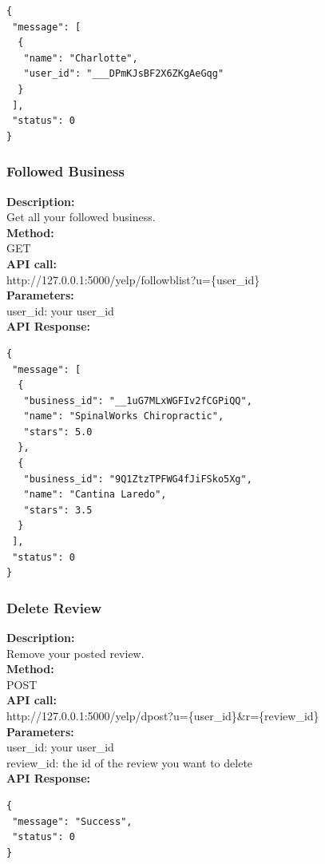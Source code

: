 \documentclass[12pt]{article}
\begin{document}
\begin{singlespacing}
\begin{lstlisting}
{
 "message": [
  {
   "name": "Charlotte",
   "user_id": "___DPmKJsBF2X6ZKgAeGqg"
  }
 ],
 "status": 0
}
\end{lstlisting}
\end{singlespacing}

\subsubsection{Followed Business}
\textbf{Description:}\\
Get all your followed business.\\
\textbf{Method:}\\
GET\\
\textbf{API call:}\\ 
http://127.0.0.1:5000/yelp/followblist?u=\{user\_id\}\\
\textbf{Parameters:}\\
user\_id: your user\_id\\
\textbf{API Response:}

\begin{singlespacing}
\begin{lstlisting}
{
 "message": [
  {
   "business_id": "__1uG7MLxWGFIv2fCGPiQQ",
   "name": "SpinalWorks Chiropractic",
   "stars": 5.0
  },
  {
   "business_id": "9Q1ZtzTPFWG4fJiFSko5Xg",
   "name": "Cantina Laredo",
   "stars": 3.5
  }
 ],
 "status": 0
}
\end{lstlisting}
\end{singlespacing}

\subsubsection{Delete Review}
\textbf{Description:}\\
Remove your posted review.\\
\textbf{Method:}\\
POST\\
\textbf{API call:}\\ 
http://127.0.0.1:5000/yelp/dpost?u=\{user\_id\}\&r=\{review\_id\}\\
\textbf{Parameters:}\\
user\_id: your user\_id\\
review\_id: the id of the review you want to delete\\
\textbf{API Response:}

\begin{singlespacing}
\begin{lstlisting}
{
 "message": "Success",
 "status": 0
}
\end{lstlisting}
\end{singlespacing}
\end{document}
